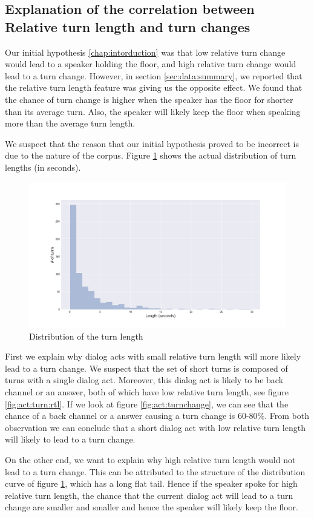 \subsection{Explanation of the correlation between Relative turn length and turn changes}
\label{sec:opposite}

Our initial hypothesis \ref{chap:intorduction} was that low relative turn change would lead to a speaker holding the floor, and high relative turn change would lead to a turn change. However, in section \ref {sec:data:summary}, we reported that the relative turn length feature was giving us the opposite effect.
We found that the chance of turn change is higher when the speaker has the floor for shorter than its average turn. Also, the speaker will likely keep the floor when speaking more than the average turn length.

We suspect that the reason that our initial hypothesis proved to be incorrect is due to the nature of the corpus. Figure \ref {fig:turn_dist} shows the actual distribution of turn lengths (in seconds).

\begin{figure}[ht!]
\centering
\includegraphics[width=\textwidth]{../scikitlearn/figures/f10.png}\vspace{-1em}
\caption{Distribution of the turn length}
\label{fig:turn_dist}
\end{figure}
%

First we explain why dialog acts with small relative turn length will more likely lead to a turn change. We suspect that the set of short turns is composed of turns with a single dialog act. Moreover, this dialog act is likely to be back channel or an answer, both of which have low relative turn length, see figure \ref{fig:act:turn:rtl}. If we look at figure \ref{fig:act:turnchange}, we can see that the chance of a back channel or a answer causing a turn change is 60-80\%. From both observation we can conclude that a short dialog act with low relative turn length will likely to lead to a turn change.

On the other end, we want to explain why high relative turn length would not lead to a turn change. This can be attributed to the structure of the distribution curve of figure \ref{fig:turn_dist}, which has a long flat tail. Hence if the speaker spoke for high relative turn length, the chance that the current dialog act will lead to a turn change are smaller and smaller and hence the speaker will likely keep the floor.
